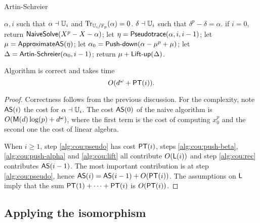 \begin{algorithm}
  \caption{Artin-Schreier}
  \begin{algorithmic}[1]
    \REQUIRE $\alpha,i$ such that $\alpha\dashv\mathbb{U}_i$ and $\operatorname{Tr}_{\mathbb{U}_i/\mathbb{F}_p}(\alpha)=0$.
    \ENSURE $\delta\dashv\mathbb{U}_i$ such that $\delta^p-\delta=\alpha$.
    \STATE \label{alg:cou:base}if $i=0$, return ${\sf NaiveSolve}(X^p-X-\alpha)$;
    \STATE \label{alg:cou:pseudo} let $\eta = {\sf Pseudotrace}(\alpha, i,i-1)$;
    \STATE \label{alg:cou:push-beta} let $\mu= {\sf ApproximateAS}(\eta)$;
    \STATE \label{alg:cou:push-alpha} let $\alpha_0=\text{{\sf Push-down}}(\alpha-\mu^p+\mu)$;
    \STATE \label{alg:cou:rec} let $\Delta =\text{{\sf Artin-Schreier}}(\alpha_0,i-1)$;
    \STATE \label{alg:cou:lift} return $\mu+\text{{\sf Lift-up}}(\Delta)$.
  \end{algorithmic}
\end{algorithm}

\begin{theorem}\label{theo:AS}
  Algorithm  is correct and takes time 
  \begin{equation}
    \label{eq:109}
    O(d^\omega + \mathsf{PT}(i))
    \text{.}
  \end{equation}
\end{theorem}
\begin{proof} 
  Correctness follows from the previous discussion.  For the
  complexity, note ${\sf AS}(i)$ the cost for $\alpha\dashv\mathbb{U}_i$. The
  cost ${\sf AS}(0)$ of the naive algorithm is $O(\mathsf{M}(d)\log(p) +
  d^\omega)$, where the first term is the cost of computing $x_0^p$
  and the second one the cost of linear algebra.

  When $i\ge1$, step \ref{alg:cou:pseudo} has cost $\mathsf{PT}(i)$, steps
  \ref{alg:cou:push-beta}, \ref{alg:cou:push-alpha} and
  \ref{alg:cou:lift} all contribute $O(\mathsf{L}(i))$ and step
  \ref{alg:cou:rec} contributes ${\sf AS}(i-1)$. The most important
  contribution is at step \ref{alg:cou:pseudo}, hence ${\sf AS}(i) =
  {\sf AS}(i-1) + O(\mathsf{PT}(i))$. The assumptions on $\mathsf{L}$ imply that
  the sum $\mathsf{PT}(1) + \cdots + \mathsf{PT}(i)$ is $O(\mathsf{PT}(i))$.
\end{proof}


\subsection{Applying the isomorphism}

